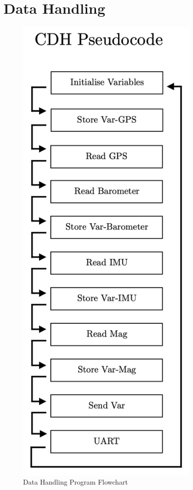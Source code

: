 \documentclass{report}
\begin{document}
        \section{Data Handling}
            \begin{figure}[H]
                \includegraphics[width=0.8\textwidth]{figures/CDH_CODE.png}
                \caption{Data Handling Program Flowchart}
                \label{fig:cdh}
            \end{figure}
\end{document}
